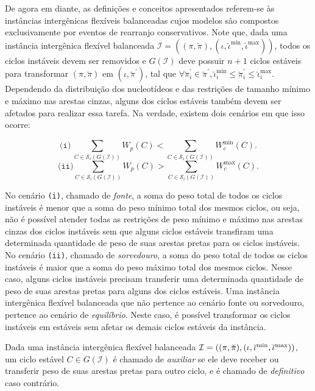 De agora em diante, as definições e conceitos apresentados referem-se às instâncias intergênicas flexíveis balanceadas cujos modelos são compostos exclusivamente por eventos de rearranjo conservativos. Note que, dada uma instância intergênica flexível balanceada $\mathcal{I} = ((\pi,\breve\pi),(\iota,\breve\iota^{\min},\breve\iota^{\max}))$, todos os ciclos instáveis devem ser removidos e $G(\mathcal{I})$ deve possuir $n+1$ ciclos estáveis para transformar $(\pi,\breve\pi)$ em $(\iota,\breve\pi^{\prime})$, tal que $\forall \breve\pi^{\prime}_i \in \breve\pi^{\prime}, \breve\iota^{\min}_i \le \breve\pi^{\prime}_i \le \breve\iota^{\max}_i$. Dependendo da distribuição dos nucleotídeos e das restrições de tamanho mínimo e máximo nas arestas cinzas, alguns dos ciclos estáveis também devem ser afetados para realizar essa tarefa. Na verdade, existem dois cenários em que isso ocorre:

$$\texttt{(i)}~\sum_{C \in \mathcal{S}_i(G(\mathcal{I}))} W_p(C) < \sum_{C \in \mathcal{S}_i(G(\mathcal{I}))} W^{\min}_c(C).$$
$$\texttt{(ii)}\sum_{C \in \mathcal{S}_i(G(\mathcal{I}))} W_p(C) > \sum_{C \in \mathcal{S}_i(G(\mathcal{I}))} W^{\max}_c(C).$$

No cenário \texttt{(i)}, chamado de \emph{fonte}, a soma do peso total de todos os ciclos instáveis é menor que a soma do peso mínimo total dos mesmos ciclos, ou seja, não é possível atender todas as restrições de peso mínimo e máximo nas arestas cinzas dos ciclos instáveis sem que alguns ciclos estáveis transfiram uma determinada quantidade de peso de suas arestas pretas para os ciclos instáveis. No cenário \texttt{(ii)}, chamado de \emph{sorvedouro}, a soma do peso total de todos os ciclos instáveis é maior que a soma do peso máximo total dos mesmos ciclos. Nesse caso, alguns ciclos instáveis precisam transferir uma determinada quantidade de peso de suas arestas pretas para alguns dos ciclos estáveis. Uma instância intergênica flexível balanceada que não pertence ao cenário fonte ou sorvedouro, pertence ao cenário de \emph{equilíbrio}. Neste caso, é possível transformar os ciclos instáveis em estáveis sem afetar os demais ciclos estáveis da instância.

\begin{definition}
Dada uma instância intergênica flexível balanceada $\mathcal{I} = ((\pi,\breve\pi),\break(\iota,\breve\iota^{\min},\breve\iota^{\max}))$, um ciclo estável $C \in G(\mathcal{I})$ é chamado de \emph{auxiliar} se ele deve receber ou transferir peso de suas arestas pretas para outro ciclo, e é chamado de \emph{definitivo} caso contrário.
\end{definition}

